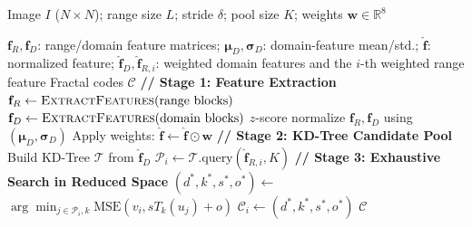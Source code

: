 \documentclass[conference, a4paper]{IEEEtran}
\newcommand{\algorithmicsymbols}{\textbf{Symbols:}}
\newcommand{\SYMBOLS}{\item[\algorithmicsymbols]}
\begin{document}
\begin{algorithm}[t]
    \caption{FGDS Encoding Pipeline}
    \label{alg:fgds}
    \begin{algorithmic}[1]
        \REQUIRE Image \mbox{$I$} (\mbox{$N\times N$}); range size \mbox{$L$}; stride \mbox{$\delta$}; pool size \mbox{$K$}; weights \mbox{$\mathbf{w}\in\mathbb{R}^8$}
        \SYMBOLS \mbox{$\mathbf f_R,\mathbf f_D$}: range/domain feature matrices; \mbox{$\boldsymbol\mu_D,\boldsymbol\sigma_D$}: domain-feature mean/std.; \mbox{$\hat{\mathbf f}$}: normalized feature; \mbox{$\hat{\mathbf f}_D,\hat{\mathbf f}_{R,i}$}: weighted domain features and the \mbox{$i$}-th weighted range feature
        \ENSURE Fractal codes \mbox{$\mathcal{C}$}
        \STATE \textbf{// Stage 1: Feature Extraction}
        \STATE \mbox{$\mathbf{f}_R\leftarrow\textsc{ExtractFeatures}(\text{range blocks})$} 
        \STATE \mbox{$\mathbf{f}_D\leftarrow\textsc{ExtractFeatures}(\text{domain blocks})$} 
        \STATE \mbox{$z$}-score normalize \mbox{$\mathbf{f}_R,\mathbf{f}_D$} using \mbox{$(\boldsymbol{\mu}_D,\boldsymbol{\sigma}_D)$}
        \STATE Apply weights: \mbox{$\hat{\mathbf{f}}\leftarrow\hat{\mathbf{f}}\odot\mathbf{w}$} 
        \STATE \textbf{// Stage 2: KD-Tree Candidate Pool}
        \STATE Build KD-Tree \mbox{$\mathcal{T}$} from \mbox{$\hat{\mathbf{f}}_D$}
        \STATE \mbox{$\mathcal{P}_i\leftarrow\mathcal{T}.\text{query}(\hat{\mathbf{f}}_{R,i},K)$} 
        \ENDFOR
        \STATE \textbf{// Stage 3: Exhaustive Search in Reduced Space}
        \STATE \mbox{$(d^*,k^*,s^*,o^*)\leftarrow$}
        \STATE \hspace{\algorithmicindent}\mbox{$\arg\min_{j\in\mathcal{P}_i,k}\mathrm{MSE}(v_i, sT_k(u_j)\!+\!o)$}
        \STATE \mbox{$\mathcal{C}_i\leftarrow(d^*,k^*,s^*,o^*)$}
        \ENDFOR
        \RETURN \mbox{$\mathcal{C}$}
    \end{algorithmic}
\end{algorithm}
\end{document}
